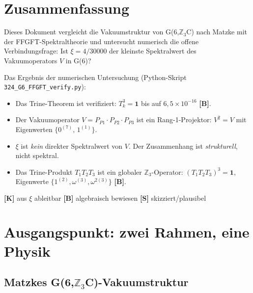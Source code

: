 \section*{Zusammenfassung}

Dieses Dokument vergleicht die Vakuumstruktur von G(6,$\mathbb{Z}_3$C) nach Matzke
mit der FFGFT-Spektraltheorie und untersucht numerisch die offene
Verbindungsfrage: Ist $\xi = 4/30000$ der kleinste Spektralwert des
Vakuumoperators $V$ in G(6)?

Das Ergebnis der numerischen Untersuchung (Python-Skript
\texttt{324\_G6\_FFGFT\_verify.py}):

\begin{itemize}
  \item Das Trine-Theorem ist verifiziert: $T_k^3 = \mathbf{1}$
    bis auf $6{,}5\times10^{-16}$ \textbf{[B]}.
  \item Der Vakuumoperator $V = P_{P1}\cdot P_{P2}\cdot P_{P3}$ ist
    ein Rang-1-Projektor: $V^2 = V$ mit Eigenwerten $\{0^{(7)},\, 1^{(1)}\}$.
  \item $\xi$ ist \emph{kein} direkter Spektralwert von $V$.
    Der Zusammenhang ist \emph{strukturell}, nicht spektral.
  \item Das Trine-Produkt $T_1 T_2 T_3$ ist ein globaler
    $\mathbb{Z}_3$-Operator: $(T_1 T_2 T_3)^3 = \mathbf{1}$,
    Eigenwerte $\{1^{(2)}, \omega^{(3)}, \omega^{2(3)}\}$ \textbf{[B]}.
\end{itemize}

\begin{keyresult}[Statusmarkierung]
\textbf{[K]} aus $\xi$ ableitbar \quad
\textbf{[B]} algebraisch bewiesen \quad
\textbf{[S]} skizziert/plausibel
\end{keyresult}

\section{Ausgangspunkt: zwei Rahmen, eine Physik}

\subsection{Matzkes G(6,$\mathbb{Z}_3$C)-Vakuumstruktur}


